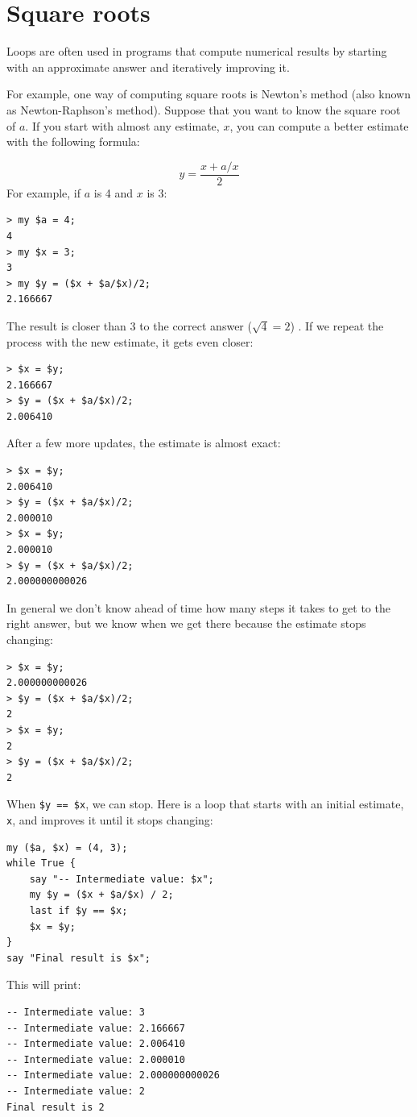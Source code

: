 \section{Square roots}
\label{squareroot}

Loops are often used in programs that compute
numerical results by starting with an approximate answer and
iteratively improving it.

For example, one way of computing square roots is Newton's method (also known as Newton-Raphson's method).
Suppose that you want to know the square root of $a$.  If you start
with almost any estimate, $x$, you can compute a better
estimate with the following formula:

\[ y = \frac{x + a/x}{2} \]
%
For example, if $a$ is 4 and $x$ is 3:

\begin{verbatim}
> my $a = 4;
4
> my $x = 3;
3
> my $y = ($x + $a/$x)/2;
2.166667
\end{verbatim}
%
The result is closer than 3 to the correct answer 
($\sqrt{4} = 2$) .  If we repeat the process with the new estimate, it gets even closer:

\begin{verbatim}
> $x = $y;
2.166667
> $y = ($x + $a/$x)/2;
2.006410
\end{verbatim}
%
After a few more updates, the estimate is almost exact:

\begin{verbatim}
> $x = $y;
2.006410
> $y = ($x + $a/$x)/2;
2.000010
> $x = $y;
2.000010
> $y = ($x + $a/$x)/2;
2.000000000026
\end{verbatim}
%
In general we don't know ahead of time how many steps it takes
to get to the right answer, but we know when we get there
because the estimate stops changing:

\begin{verbatim}
> $x = $y;
2.000000000026
> $y = ($x + $a/$x)/2;
2
> $x = $y;
2
> $y = ($x + $a/$x)/2;
2
\end{verbatim}
%
When {\tt \$y == \$x}, we can stop.  Here is a loop that starts
with an initial estimate, {\tt x}, and improves it until it
stops changing:

\begin{verbatim}
my ($a, $x) = (4, 3);
while True {
    say "-- Intermediate value: $x";
    my $y = ($x + $a/$x) / 2;
    last if $y == $x;
    $x = $y;
}
say "Final result is $x";
\end{verbatim}
%
This will print:
\begin{verbatim}
-- Intermediate value: 3
-- Intermediate value: 2.166667
-- Intermediate value: 2.006410
-- Intermediate value: 2.000010
-- Intermediate value: 2.000000000026
-- Intermediate value: 2
Final result is 2
\end{verbatim}
%


